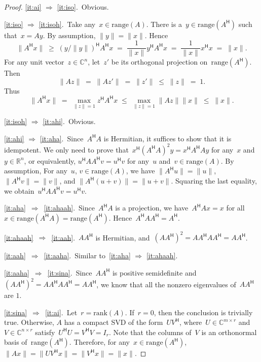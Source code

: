 \documentclass[11pt,a4paper]{article}  %
\numberwithin{equation}{section}
\theoremstyle{definition}
\def\RR{\mathbb{R}}
\def\CC{\mathbb{C}}
\newcommand{\hmt}{{\scriptscriptstyle{{\mathsf{H}}}}}
\newcommand{\rank}{\mathrm{rank}}
\newcommand{\range}{\mathrm{range}}
\begin{document}
\begin{proof}
  \ref{it:ai} $\Rightarrow $ \ref{it:iso}.~Obvious.

  \ref{it:iso} $\Rightarrow $ \ref{it:isoh}.~Take any~$x\in \range(A)$.
  There is a~$y \in \range(A^\hmt)$ such that~$x=Ay$. By assumption, $\|y\|=\|x\|$. Hence
    \begin{equation*}
      \|A^\hmt x\| \;\ge\; (y/\|y\|)^\hmt A^\hmt x \;=\; \frac{1}{\|x\|} y^\hmt A^\hmt x \;=\;
      \frac{1}{\|x\|} x^\hmt x\;=\; \|x\|.
    \end{equation*}
  For any unit vector~$z\in\CC^{n}$, let~$z'$ be its orthogonal projection on~$\range(A^\hmt)$.
  Then
  \begin{equation*}
  \|Az\|\;=\;\|Az'\|\;=\;\|z'\|\;\le\;\|z\|\;=\;1.
  \end{equation*}
  Thus
    \begin{equation*}
      \|A^\hmt x\| \;=\; \max_{\|z\|=1}z^\hmt A^\hmt x
      \;\le\; \max_{\|z\|=1}\|Az\|\|x\| \;\le\; \|x\|.
    \end{equation*}

    \ref{it:isoh} $\Rightarrow$ \ref{it:ahi}.~Obvious.

    \ref{it:ahi} $\Rightarrow $ \ref{it:aha}.~Since~$A^\hmt A$ is Hermitian, it suffices to show that it is idempotent. We
      only need to prove that~$x^\hmt(A^\hmt A)^2y=x^\hmt A^\hmt Ay$ for any~$x$ and~$y\in \RR^n$,
      or equivalently, $u^\hmt A A^\hmt v=u^\hmt v$ for  any~$u$ and~$v\in \range(A)$. By
      assumption,
      For any~$u$, $v\in\range(A)$, we have $\|A^\hmt u\|=\|u\|$, $\|A^\hmt v\|=\|v\|$, and
      $\|A^\hmt (u+v)\| = \|u+v\|$. Squaring the last equality, we obtain~$u^\hmt AA^\hmt v = u^\hmt
      v$.

      \ref{it:aha}~$\Rightarrow$~\ref{it:ahaah}.~Since~$A^\hmt A$ is a projection, we have~$A^\hmt A x = x$ for all~$x\in \range(A^\hmt A)
    = \range(A^\hmt)$. Hence~$A^\hmt AA^\hmt = A^\hmt$.

    \ref{it:ahaah}~$\Rightarrow$~\ref{it:aah}.~$AA^\hmt$ is Hermitian, and~$(AA^\hmt)^2=AA^\hmt AA^\hmt = AA^\hmt$.

    \ref{it:aah}~$\Rightarrow$~\ref{it:aaha}.~Similar to~\ref{it:aha} $\Rightarrow$ \ref{it:ahaah}.

    \ref{it:aaha}~$\Rightarrow$~\ref{it:sina}.~Since~$AA^\hmt$ is positive semidefinite
    and~$(AA^\hmt)^2=AA^\hmt AA^\hmt =AA^\hmt$, we know that all the nonzero eigenvalues of~$AA^\hmt$ are $1$.

    \ref{it:sina}~$\Rightarrow$~\ref{it:ai}.~Let~$r=\rank(A)$. If~$r = 0$, then the conclusion is trivially true.
       Otherwise, $A$ has a compact SVD of the form~$UV^\hmt$,
       where~$U\in\CC^{m\times r}$ and~$V\in\CC^{n\times r}$ satisfy~$U^\hmt U = V^\hmt V = I_r$.
       Note that the columns of~$V$ is an orthonormal basis of~$\range(A^\hmt)$.
       Therefore, for any~$x\in \range(A^\hmt)$,
         $\|A x\|= \|UV^\hmt x\| = \|V^\hmt x\| = \|x\|$.
\end{proof}
\end{document}
